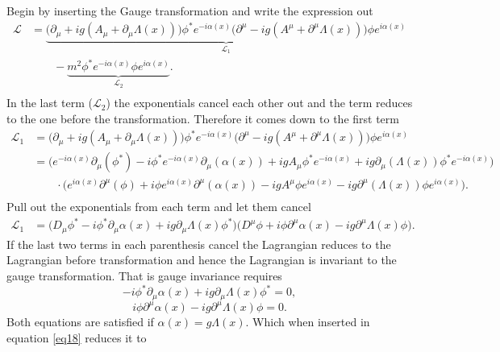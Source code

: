 \begin{example}
	Begin by inserting the Gauge transformation and write the expression out
	\begin{equation}
		\begin{split}
			\mathcal{L}&=\underbrace{\bigg(\partial_\mu+ig(A_\mu+\partial_\mu\Lambda(x))\bigg)\phi^* e^{-i\alpha(x)}\bigg(\partial^\mu-ig(A^\mu+\partial^\mu\Lambda(x))\bigg)\phi e^{i\alpha(x)}}_{\mathcal{L}_1}\\
			&\qquad-\underbrace{m^2\phi^* e^{-i\alpha(x)}\phi e^{i\alpha(x)}}_{\mathcal{L}_2}.\\
		\end{split}
		\label{eq18}
	\end{equation} 
	In the last term ($\mathcal{L}_2$) the exponentials cancel each other out and the term reduces to the one before the transformation. Therefore it comes down to the first term
	\begin{equation}
		\begin{split}
			\mathcal{L}_1&=\bigg(\partial_\mu+ig(A_\mu+\partial_\mu\Lambda(x))\bigg)\phi^* e^{-i\alpha(x)}\bigg(\partial^\mu-ig(A^\mu+\partial^\mu\Lambda(x))\bigg)\phi e^{i\alpha(x)}\\
			&=\bigg(e^{-i\alpha(x)}\partial_\mu(\phi^*)-i\phi^*e^{-i\alpha(x)}\partial_\mu(\alpha(x))+igA_\mu\phi^*e^{-i\alpha(x)}+ig\partial_\mu(\Lambda(x))\phi^* e^{-i\alpha(x)}\bigg)\\
			&\qquad\cdot \bigg(e^{i\alpha(x)}\partial^\mu(\phi)+i\phi e^{i\alpha(x)}\partial^\mu(\alpha(x))-igA^\mu\phi e^{i\alpha(x)}-ig\partial^\mu(\Lambda(x))\phi e^{i\alpha(x)}\bigg).\\
		\end{split}
		\label{mother}
	\end{equation} 
	Pull out the exponentials from each term and let them cancel
	\begin{equation}
		\begin{split}
			\mathcal{L}_1&=\bigg(D_\mu\phi^*-i\phi^*\partial_\mu\alpha(x)+ig\partial_\mu\Lambda(x)\phi^* \bigg) \bigg(D^\mu\phi+i\phi \partial^\mu\alpha(x) -ig\partial^\mu\Lambda(x)\phi \bigg).
		\end{split}
	\end{equation} 
	If the last two terms in each parenthesis cancel the Lagrangian reduces to the Lagrangian before transformation and hence the Lagrangian is invariant to the gauge transformation. That is gauge invariance requires
	\begin{equation}
		-i\phi^*\partial_\mu\alpha(x)+ig\partial_\mu\Lambda(x)\phi^* =0,
	\end{equation} 
	\begin{equation}
		i\phi \partial^\mu\alpha(x)-ig\partial^\mu\Lambda(x)\phi =0.
	\end{equation} 
	Both equations are satisfied if $\alpha(x)=g\Lambda(x)$. Which when inserted in equation \ref{eq18} reduces it to 
\end{example}
